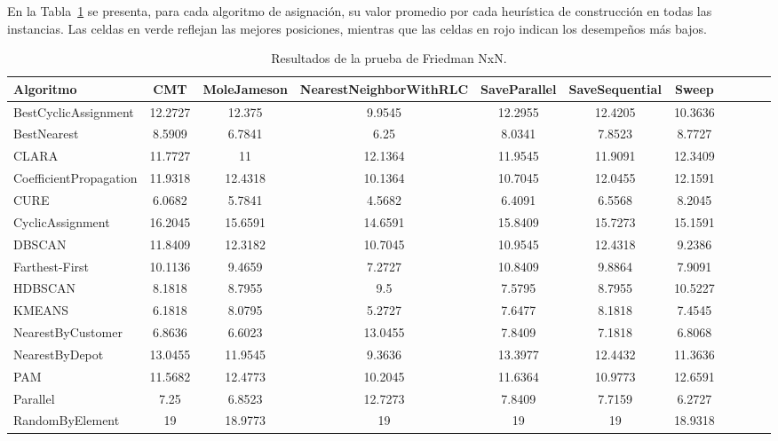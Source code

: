 En la Tabla~\ref{tab:friedman_hdbscan} se presenta, para cada algoritmo de asignaci\'on, su valor promedio por cada heur\'istica de construcci\'on en todas las instancias. Las celdas en verde reflejan las mejores posiciones, mientras que las celdas en rojo indican los desempe\~nos m\'as bajos.

\clearpage
	\begin{landscape}
\begin{table}[H]
\centering
\caption{Resultados de la prueba de Friedman NxN.}
\label{tab:friedman_hdbscan}
\footnotesize
\begin{tabular}{@{}lcccccccccc@{}}
\toprule
\textbf{Algoritmo} & \textbf{CMT} & \textbf{MoleJameson} & \textbf{NearestNeighborWithRLC} & \textbf{SaveParallel} & \textbf{SaveSequential} & \textbf{Sweep} \\
\midrule
    BestCyclicAssignment & 12.2727 & 12.375 & 9.9545 & 12.2955 & 12.4205 & 10.3636 \\
    BestNearest & 8.5909 & 6.7841 & 6.25  & 8.0341 & 7.8523 & 8.7727 \\
    CLARA & 11.7727 & 11    & 12.1364 & 11.9545 & 11.9091 & 12.3409 \\
    CoefficientPropagation & 11.9318 & 12.4318 & 10.1364 & 10.7045 & 12.0455 & 12.1591 \\
    CURE  & \cellcolor[rgb]{ 0,  .69,  .314}6.0682 & \cellcolor[rgb]{ 0,  .69,  .314}5.7841 & 4.5682 & 6.4091 & 6.5568 & 8.2045 \\
    CyclicAssignment & 16.2045 & 15.6591 & 14.6591 & 15.8409 & 15.7273 & 15.1591 \\
    DBSCAN & 11.8409 & 12.3182 & 10.7045 & 10.9545 & 12.4318 & 9.2386 \\
    Farthest-First & 10.1136 & 9.4659 & 7.2727 & 10.8409 & 9.8864 & 7.9091 \\
    HDBSCAN & 8.1818 & 8.7955 & 9.5   & 7.5795 & 8.7955 & 10.5227 \\
    KMEANS & 6.1818 & 8.0795 & 5.2727 & 7.6477 & 8.1818 & 7.4545 \\
    NearestByCustomer & 6.8636 & 6.6023 & 13.0455 & 7.8409 & 7.1818 & 6.8068 \\
    NearestByDepot & 13.0455 & 11.9545 & 9.3636 & 13.3977 & 12.4432 & 11.3636 \\
    PAM   & 11.5682 & 12.4773 & 10.2045 & 11.6364 & 10.9773 & 12.6591 \\
    Parallel & 7.25  & 6.8523 & 12.7273 & 7.8409 & 7.7159 & \cellcolor[rgb]{ 0,  .69,  .314}6.2727 \\
    RandomByElement & \cellcolor[rgb]{ 1,  0,  0}19 & \cellcolor[rgb]{ 1,  0,  0}18.9773 & \cellcolor[rgb]{ 1,  0,  0}19 & \cellcolor[rgb]{ 1,  0,  0}19 & \cellcolor[rgb]{ 1,  0,  0}19 & \cellcolor[rgb]{ 1,  0,  0}18.9318 \\

\end{tabular}
\end{table}
\end{landscape}
